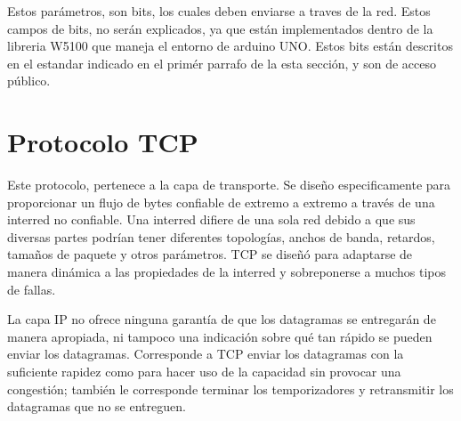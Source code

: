 Estos parámetros, son bits, los cuales deben enviarse a traves de la red. Estos campos de bits, no serán explicados, ya que están implementados dentro de la libreria W5100 que maneja el entorno de arduino UNO. Estos bits están descritos en el estandar indicado en el primér parrafo de la esta sección, y son de acceso público. 


\section{Protocolo TCP } 
Este protocolo, pertenece a la capa de transporte. Se diseño especificamente para proporcionar un flujo de bytes confiable de extremo a extremo a través de una interred no confiable. Una interred difiere de una sola red debido a que sus diversas partes podrían tener diferentes topologías, anchos de banda, retardos, tamaños de paquete y otros parámetros. TCP se diseñó para adaptarse de manera dinámica a las propiedades de la interred y sobreponerse a muchos tipos de fallas.



La capa IP no ofrece ninguna garantía de que los datagramas se entregarán de manera apropiada, ni tampoco una indicación sobre qué tan rápido se pueden enviar los datagramas. Corresponde a TCP enviar los datagramas con la suficiente rapidez como para hacer uso de la capacidad sin provocar una congestión; también le corresponde terminar los temporizadores y retransmitir los datagramas que no se entreguen. 

